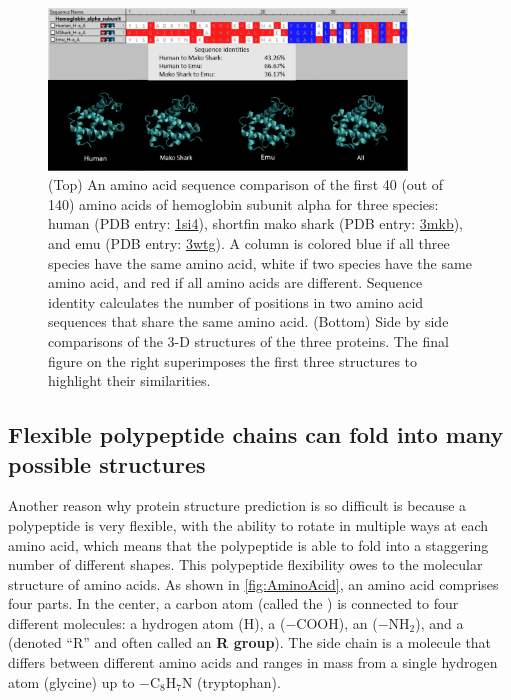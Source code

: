 \begin{figure}[h]
	\centering
	\mySfFamily
	\includegraphics[width = 0.85\textwidth]{../images/SequenceStructureExample.png}
	\caption{(Top) An amino acid sequence comparison of the first 40 (out of 140) amino acids of hemoglobin subunit alpha for three species: human (PDB entry: \href{https://www.rcsb.org/structure/1si4}{1si4}), shortfin mako shark (PDB entry: \href{https://www.rcsb.org/structure/3mkb}{3mkb}), and emu (PDB entry: \href{https://www.rcsb.org/structure/3wtg}{3wtg}). A column is colored blue if all three species have the same amino acid, white if two species have the same amino acid, and red if all amino acids are different. Sequence identity calculates the number of positions in two amino acid sequences that share the same amino acid. (Bottom) Side by side comparisons of the 3-D structures of the three proteins. The final figure on the right superimposes the first three structures to highlight their similarities.}
	\label{fig:SequenceStructureExample}
\end{figure}

\subsection{Flexible polypeptide chains can fold into many possible structures}

Another reason why protein structure prediction is so difficult is because a polypeptide is very flexible, with the ability to rotate in multiple ways at each amino acid, which means that the polypeptide is able to fold into a staggering number of different shapes. This polypeptide flexibility owes to the molecular structure of amino acids. As shown in \autoref{fig:AminoAcid}, an amino acid comprises four parts. In the center, a carbon atom (called the ) is connected to four different molecules: a hydrogen atom (H), a  ($-\text{COOH}$), an  ($-\text{NH}_2$), and a  (denoted ``R'' and often called an \textbf{R group}). The side chain is a molecule that differs between different amino acids and ranges in mass from a single hydrogen atom (glycine) up to $-\text{C}_8\text{H}_7\text{N}$ (tryptophan).\\

